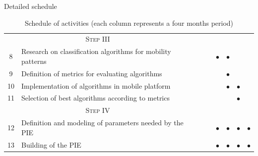 \documentclass[9pt,xcolor={dvipsnames},handout]{beamer}
\newcommand{\markdone}{\textcolor{PineGreen}{$\bullet$}}
\begin{document}
\begin{frame}{Detailed schedule}
\begin{table}[]
{\begin{tabular}{clccccccc}
\multicolumn{2}{c}{\textsc{Step III}}                                              &  &  &  &  &  &  &  \\
8  & Research on classification algorithms for mobility patterns                   &  &  &  & \markdone & \markdone &  &  \\
9  & Definition of metrics for evaluating algorithms                               &  &  &  &  & \markdone &  &  \\
10 & Implementation of algorithms in mobile platform                               &  &  &  &  & \markdone & \markdone  &  \\
11 & Selection of best algorithms according to metrics                             &  &  &  &  &  & \markdone &  \vspace{1em}\\

\multicolumn{2}{c}{\textsc{Step IV}}                                               &  &  &  &  &  &  &  \\
12 & Definition and modeling of parameters needed by the PIE                       &  &  &  & \markdone & \markdone & \markdone & \markdone \\
13 & Building of the PIE                                                           &  &  &  & \markdone & \markdone & \markdone & \markdone \\
\bottomrule
\end{tabular}%
}
\caption{Schedule of activities (each column represents a four months period)}
\label{tbl:schedule-part-one}
\end{table}
\end{frame}
\end{document}
